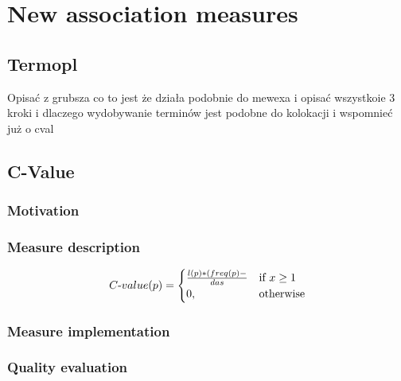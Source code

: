 \chapter{New association measures}


\section{Termopl}
Opisać z grubsza co to jest że działa podobnie do mewexa i opisać wszystkoie 3 kroki i dlaczego wydobywanie terminów
jest podobne do kolokacji i wspomnieć już o cval

\section{C-Value}

\subsection{Motivation}

\subsection{Measure description}
\[ 
    C{\text -}value(p) = \begin{cases}
        l(p) * (freq(p) - \over{das} & \text{if } x\geq 1\\
        0,              & \text{otherwise}
    \end{cases}
\]
\subsection{Measure implementation}

\subsection{Quality evaluation}